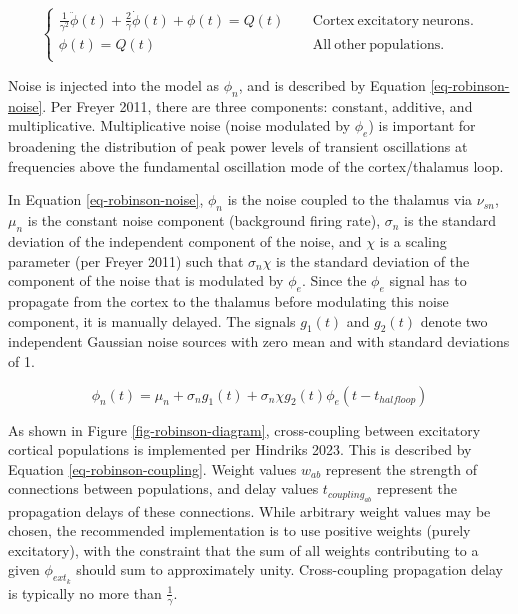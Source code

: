 \begin{equation}
\left \{
\begin{array}{rcl}
\frac{1}{\gamma^2} \ddot{\phi}(t) + \frac{2}{\gamma} \dot{\phi}(t) + \phi(t)
= Q(t) & ~~ & \mathrm{Cortex ~ excitatory ~ neurons.} \\
\phi(t) = Q(t) & ~~ & \mathrm{All ~ other ~ populations.} \\
\end{array}
\right .
\label{eq-robinson-gamma}
\end{equation}

Noise is injected into the model as $\phi_n$, and is described by Equation
\ref{eq-robinson-noise}. Per Freyer 2011, there are three components:
constant, additive, and multiplicative. Multiplicative noise (noise
modulated by $\phi_e$) is important for broadening the distribution of
peak power levels of transient oscillations at frequencies above the
fundamental oscillation mode of the cortex/thalamus loop.

In Equation \ref{eq-robinson-noise}, $\phi_n$ is the noise coupled to
the thalamus via $\nu_{sn}$, $\mu_n$ is the constant noise component
(background firing rate), $\sigma_n$ is the standard deviation of the
independent component of the noise, and $\chi$ is a scaling parameter
(per Freyer 2011) such that $\sigma_n \chi$ is the standard deviation of
the component of the noise that is modulated by $\phi_e$. Since the $\phi_e$
signal has to propagate from the cortex to the thalamus before modulating
this noise component, it is manually delayed. The signals $g_1(t)$ and
$g_2(t)$ denote two independent Gaussian noise sources with zero mean and
with standard deviations of 1.

\begin{equation}
\phi_n(t) = \mu_n + \sigma_n g_1(t)
+ \sigma_n \chi g_2(t) \phi_e(t - t_{halfloop})
\label{eq-robinson-noise}
\end{equation}

As shown in Figure \ref{fig-robinson-diagram}, cross-coupling between
excitatory cortical populations is implemented per Hindriks 2023. This is
described by Equation \ref{eq-robinson-coupling}. Weight values
$w_{ab}$ represent the strength of connections between populations, and
delay values $t_{coupling_{ab}}$ represent the propagation delays of these
connections.
While arbitrary weight values may be chosen, the recommended implementation
is to use positive weights (purely excitatory), with the constraint that the
sum of all weights contributing to a given $\phi_{ext_k}$ should sum to
approximately unity. Cross-coupling propagation delay is typically no more
than $\frac{1}{\gamma}$.

